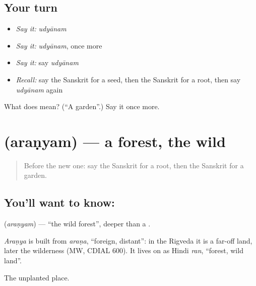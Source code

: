 \subsection*{Your turn}
\begin{itemize}
\raggedright
  \item \emph{Say it:} \emph{udyānam}
  \item \emph{Say it:} \emph{udyānam}, once more
  \item \emph{Say it:} say \emph{udyānam}
  \item \emph{Recall:} say the Sanskrit for a seed, then the Sanskrit for a root, then say \emph{udyānam} again
\end{itemize}

\begin{tcolorbox}[breakable,colback=teal!4,colframe=teal!35!black,title={Before you move on}]
What does  mean? (\textquotedblleft{}A garden\textquotedblright{}.) Say it once more.
\end{tcolorbox}
\section[\texorpdfstring{\sk{अरण्यम्} (araṇyam)}{अरण्यम् (araṇyam)}]{ (araṇyam) — a forest, the wild}

\label{lesson:SA-C81-forest}



\begin{quote}
Before the new one: say the Sanskrit for a root, then the Sanskrit for a garden.
\end{quote}

\subsection*{You'll want to know: }
\textbf{} (\emph{araṇyam}) — \textquotedblleft{}the wild forest\textquotedblright{}, deeper than a \textbf{}.

\begin{cousinweb}
\emph{Araṇya} is built from \emph{araṇa}, \textquotedblleft{}foreign, distant\textquotedblright{}: in the Rigveda it is a far-off land, later the wilderness (MW, CDIAL 600). It lives on as Hindi \emph{ran}, \textquotedblleft{}forest, wild land\textquotedblright{}.
\end{cousinweb}

\begin{grammarlens}[title={What you've built}]
The unplanted place.
\end{grammarlens}

